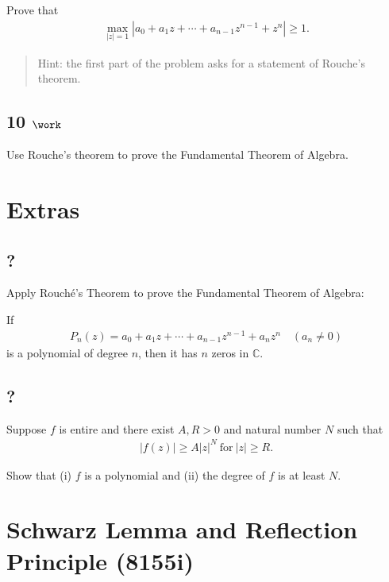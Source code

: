 Prove that
\begin{align*}
\max_{{\left\lvert {z} \right\rvert} = 1} {\left\lvert {a_0 + a_1 z + \cdots + a_{n-1}z^{n-1} + z^n} \right\rvert} \geq 1
.\end{align*}

\begin{quote}
Hint: the first part of the problem asks for a statement of Rouche's
theorem.
\end{quote}

\hypertarget{work-69}{%
\subsection{\texorpdfstring{10
\(\work\)}{10 \textbackslash work}}\label{work-69}}

Use Rouche's theorem to prove the Fundamental Theorem of Algebra.

\hypertarget{extras}{%
\section{Extras}\label{extras}}

\hypertarget{section-10}{%
\subsection{?}\label{section-10}}

Apply Rouché's Theorem to prove the Fundamental Theorem of Algebra:

If
\begin{align*}
P_n(z) = a_0 + a_1z + \cdots + a_{n-1}z^{n-1} + a_nz^n\quad  (a_n \neq 0)
\end{align*}
is a polynomial of degree \(n\), then it has \(n\) zeros in
\(\mathbb{C}\).

\hypertarget{section-11}{%
\subsection{?}\label{section-11}}

Suppose \(f\) is entire and there exist \(A, R >0\) and natural number
\(N\) such that
\begin{align*}|f(z)| \geq A |z|^N\ \text{for}\ |z| \geq R.\end{align*}

Show that (i) \(f\) is a polynomial and (ii) the degree of \(f\) is at
least \(N\).

\hypertarget{schwarz-lemma-and-reflection-principle-8155i}{%
\section{Schwarz Lemma and Reflection Principle
(8155i)}\label{schwarz-lemma-and-reflection-principle-8155i}}

